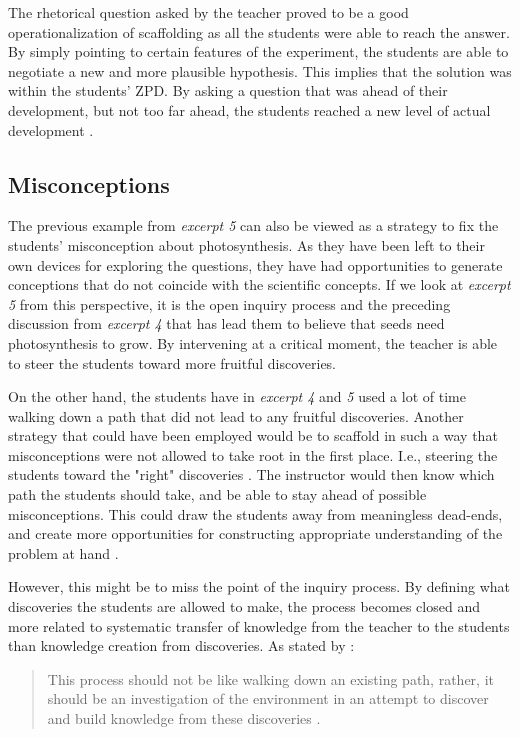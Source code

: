 The rhetorical question asked by the teacher proved to be a good operationalization of scaffolding as all the students were able to reach the answer. By simply pointing to certain features of the experiment, the students are able to negotiate a new and more plausible hypothesis. This implies that the solution was within the students' ZPD. By asking a question that was ahead of their development, but not too far ahead, the students reached a new level of actual development  \citep{vygotskiui1978mind}.

\subsection{Misconceptions}
The previous example from \emph{excerpt 5} can also be viewed as a strategy to fix the students' misconception about photosynthesis. As they have been left to their own devices for exploring the questions, they have had opportunities to generate conceptions that do not coincide with the scientific concepts. If we look at \emph{excerpt 5} from this perspective, it is the open inquiry process and the preceding discussion from \emph{excerpt 4} that has lead them to believe that seeds need photosynthesis to grow. By intervening at a critical moment, the teacher is able to steer the students toward more fruitful discoveries. 

On the other hand, the students have in \emph{excerpt 4} and \emph{5} used a lot of time walking down a path that did not lead to any fruitful discoveries. Another strategy that could have been employed would be to scaffold in such a way that misconceptions were not allowed to take root in the first place. I.e., steering the students toward the "right" discoveries \citep{kluge2010simulation}. The instructor would then know which path the students should take, and be able to stay ahead of possible misconceptions. This could draw the students away from meaningless dead-ends, and create more opportunities for constructing appropriate understanding of the problem at hand \citep{kluge2010simulation}.

However, this might be to miss the point of the inquiry process. By defining what discoveries the students are allowed to make, the process becomes closed and more related to systematic transfer of knowledge from the teacher to the students than knowledge creation from discoveries. As stated by \citeauthor{de1998scientific}: \begin{quote}This process should not be like walking down an existing path, rather, it should be an investigation of the environment in an attempt to discover and build knowledge from these discoveries \citetext{\citealp{de1998scientific}, referenced in \citealp{kluge2010simulation}, p. 246}.
\end{quote}

